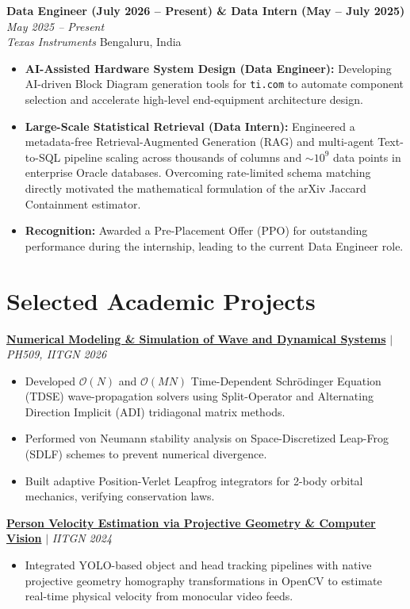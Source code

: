 \documentclass[10pt,a4paper]{article}
\newcommand{\entryheader}[4]{
  \textbf{#1} \hfill \textit{#2} \\
  \textit{#3} \hfill #4 \vspace{2pt}
}
\newcommand{\projectheader}[3]{
  \textbf{#1} $\vert{}$ \textit{#2} \hfill \textit{#3} \vspace{2pt}
}
\begin{document}
\vspace{4pt}
\entryheader{Data Engineer (July 2026 -- Present) \& Data Intern (May -- July 2025)}{May 2025 -- Present}{Texas Instruments}{Bengaluru, India}
\begin{itemize}
    \item \textbf{AI-Assisted Hardware System Design (Data Engineer):} Developing AI-driven Block Diagram generation tools for \texttt{ti.com} to automate component selection and accelerate high-level end-equipment architecture design.
    \item \textbf{Large-Scale Statistical Retrieval (Data Intern):} Engineered a metadata-free Retrieval-Augmented Generation (RAG) and multi-agent Text-to-SQL pipeline scaling across thousands of columns and $\sim 10^9$ data points in enterprise Oracle databases. Overcoming rate-limited schema matching directly motivated the mathematical formulation of the arXiv Jaccard Containment estimator.
    \item \textbf{Recognition:} Awarded a Pre-Placement Offer (PPO) for outstanding performance during the internship, leading to the current Data Engineer role.
\end{itemize}

\section{Selected Academic Projects}

\projectheader{\href{https://pranav-joshi-iitgn.github.io/PH509/}{Numerical Modeling \& Simulation of Wave and Dynamical Systems}}{PH509, IITGN}{2026}
\begin{itemize}
    \item Developed $\mathcal{O}(N)$ and $\mathcal{O}(MN)$ Time-Dependent Schr\"{o}dinger Equation (TDSE) wave-propagation solvers using Split-Operator and Alternating Direction Implicit (ADI) tridiagonal matrix methods.
    \item Performed von Neumann stability analysis on Space-Discretized Leap-Frog (SDLF) schemes to prevent numerical divergence.
    \item Built adaptive Position-Verlet Leapfrog integrators for 2-body orbital mechanics, verifying conservation laws.
\end{itemize}

\vspace{3pt}
\projectheader{\href{https://github.com/pranav-joshi-iitgn/YajatProject}{Person Velocity Estimation via Projective Geometry \& Computer Vision}}{IITGN}{2024}
\begin{itemize}
    \item Integrated YOLO-based object and head tracking pipelines with native projective geometry homography transformations in OpenCV to estimate real-time physical velocity from monocular video feeds.
\end{itemize}
\end{document}
